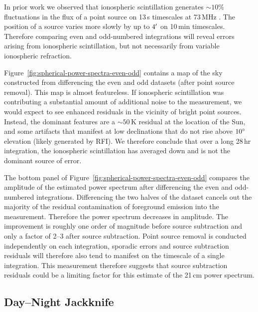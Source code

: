 \begin{bibunit}
In prior work we observed that ionospheric scintillation generates $\sim10\%$ fluctuations in the
flux of a point source on 13\,s timescales at 73\,MHz \citep{2018AJ....156...32E}. The position of a
source varies more slowly by up to $4\mbox{$^\prime$}$ on 10\,min timescales. Therefore comparing even and
odd-numbered integrations will reveal errors arising from ionospheric scintillation, but not
necessarily from variable ionospheric refraction.

Figure~\ref{fig:spherical-power-spectra-even-odd} contains a map of the sky constructed from
differencing the even and odd datasets (after point source removal).  This map is almost
featureless. If ionospheric scintillation was contributing a substantial amount of additional noise
to the measurement, we would expect to see enhanced residuals in the vicinity of bright point
sources. Instead, the dominant features are a $\sim50\,\text{K}$ residual at the location of the
Sun, and some artifacts that manifest at low declinations that do not rise above $10\mbox{$^\circ$}$
elevation (likely generated by RFI). We therefore conclude that over a long 28\,hr integration, the
ionospheric scintillation has averaged down and is not the dominant source of error.

The bottom panel of Figure~\ref{fig:spherical-power-spectra-even-odd} compares the amplitude of the
estimated power spectrum after differencing the even and odd-numbered integrations. Differencing the
two halves of the dataset cancels out the majority of the residual contamination of foreground
emission into the measurement. Therefore the power spectrum decreases in amplitude. The improvement
is roughly one order of magnitude before source subtraction and only a factor of 2--3 after source
subtraction. Point source removal is conducted independently on each integration, sporadic errors
and source subtraction residuals will therefore also tend to manifest on the timescale of a single
integration. This measurement therefore suggests that source subtraction residuals could be a
limiting factor for this estimate of the 21\,cm power spectrum.

\subsection{Day--Night Jackknife}


\end{bibunit}
